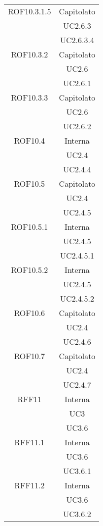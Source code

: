 \begin{longtable}{|c|c|}
\midrule
ROF10.3.1.5
& Capitolato\\
& UC2.6.3\\
& UC2.6.3.4
\\

\midrule
ROF10.3.2
& Capitolato\\
& UC2.6\\
& UC2.6.1
\\

\midrule
ROF10.3.3
& Capitolato\\
& UC2.6\\
& UC2.6.2
\\

\midrule
ROF10.4
& Interna\\
& UC2.4\\
& UC2.4.4
\\

\midrule
ROF10.5
& Capitolato\\
& UC2.4\\
& UC2.4.5
\\

\midrule
ROF10.5.1
& Interna\\
& UC2.4.5\\
& UC2.4.5.1
\\

\midrule
ROF10.5.2
& Interna\\
& UC2.4.5\\
& UC2.4.5.2
\\

\midrule
ROF10.6
& Capitolato\\
& UC2.4\\
& UC2.4.6
\\

\midrule
ROF10.7
& Capitolato\\
& UC2.4\\
& UC2.4.7
\\



\midrule
RFF11
& Interna\\
& UC3\\
& UC3.6\\

\midrule
RFF11.1
& Interna\\
& UC3.6\\
& UC3.6.1\\

\midrule
RFF11.2
& Interna\\
& UC3.6\\
& UC3.6.2\\


\end{longtable}
